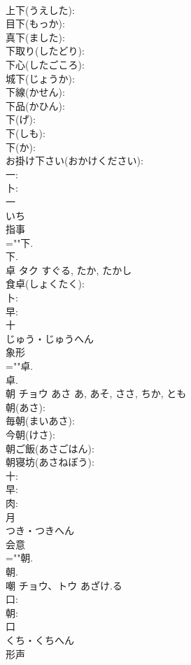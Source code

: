 \documentclass[8pt]{extreport}
\begin{document}
\begin{CJK}{UTF8}{min}
\\	上下(うえした): 
\\	目下(もっか): 
\\	真下(ました): 
\\	下取り(したどり): 
\\	下心(したごころ): 
\\	城下(じょうか): 
\\	下線(かせん): 
\\	下品(かひん): 
\\	下(げ): 
\\	下(しも): 
\\	下(か): 
\\	お掛け下さい(おかけください): 
\\	一: 
\\	卜: 
\\	一	
\\	いち	
\\	指事 
\\	=""下.
\\	下.
\\	卓	タク		すぐる, たか, たかし	
\\	食卓(しょくたく): 
\\	卜: 
\\	早: 
\\	十	
\\	じゅう・じゅうへん	
\\	象形 
\\	=""卓.
\\	卓.
\\	朝	チョウ	あさ	あ, あそ, ささ, ちか, とも	
\\	朝(あさ): 
\\	毎朝(まいあさ): 
\\	今朝(けさ): 
\\	朝ご飯(あさごはん): 
\\	朝寝坊(あさねぼう): 
\\	十: 
\\	早: 
\\	肉: 
\\	月	
\\	つき・つきへん	
\\	会意 
\\	=""朝.
\\	朝.
\\	嘲	チョウ、トウ	あざけ.る		
\\	口: 
\\	朝: 
\\	口	
\\	くち・くちへん	
\\	形声 

\end{CJK}
\end{document}
